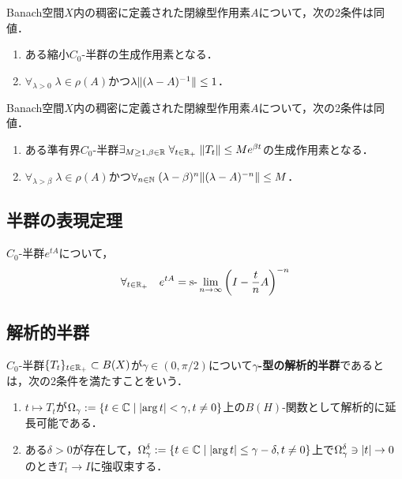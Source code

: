 \documentclass[uplatex,dvipdfmx]{jsreport}
\begin{document}
\begin{theorem}
    Banach空間$X$内の稠密に定義された閉線型作用素$A$について，次の2条件は同値．
    \begin{enumerate}
        \item ある縮小$C_0$-半群の生成作用素となる．
        \item $\forall_{\lambda>0}\;\lambda\in\rho(A)$かつ$\lambda\|(\lambda-A)^{-1}\|\le 1$．
    \end{enumerate}
\end{theorem}

\begin{theorem}[R. Phillips]
    Banach空間$X$内の稠密に定義された閉線型作用素$A$について，次の2条件は同値．
    \begin{enumerate}
        \item ある準有界$C_0$-半群$\exists_{M\ge1,\beta\in\mathbb{R}}\;\forall_{t\in\mathbb{R}_+}\;\|T_t\|\le Me^{\beta t}$の生成作用素となる．
        \item $\forall_{\lambda>\beta}\;\lambda\in\rho(A)$かつ$\forall_{n\in\mathbb{N}}\;(\lambda-\beta)^n\|(\lambda-A)^{-n}\|\le M$．
    \end{enumerate}
\end{theorem}

\subsection{半群の表現定理}

\begin{theorem}
    $C_0$-半群$e^{tA}$について，
    \[\forall_{t\in\mathbb{R}_+}\quad e^{tA}=\text{s-}\lim_{n\to\infty}\left(I-\frac{t}{n}A\right)^{-n}\]
\end{theorem}

\subsection{解析的半群}

\begin{definition}
    $C_0$-半群$\{T_t\}_{t\in\mathbb{R}_+}\subset B(X)$が$\gamma\in(0,\pi/2)$について\textbf{$\gamma$-型の解析的半群}であるとは，次の2条件を満たすことをいう．
    \begin{enumerate}
        \item $t\mapsto T_t$が$\Omega_\gamma:=\left\{t\in\mathbb{C}\mid\lvert\arg t\rvert<\gamma,t\ne0\right\}$上の$B(H)$-関数として解析的に延長可能である．
        \item ある$\delta>0$が存在して，$\Omega_\gamma^\delta:=\left\{t\in\mathbb{C}\mid\lvert\arg t\rvert\le\gamma-\delta,t\ne0\right\}$上で$\Omega_\gamma^\delta\ni\lvert t\rvert\to0$のとき$T_t\to I$に強収束する．
    \end{enumerate}
\end{definition}
\end{document}
